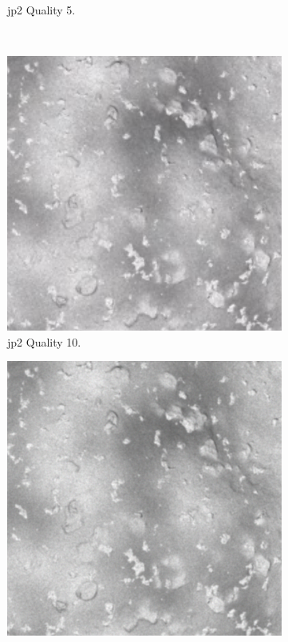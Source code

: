 \begin{figure}[htb]
\begin{subfigure}[b]{0.47\textwidth}
            \caption{\gls{jp2} Quality 5.}
            \label{fig:img_quality_5}
        \end{subfigure}
        \\
        \begin{subfigure}[b]{0.47\textwidth}
            \centering
            \includegraphics[width=\textwidth]{doc/thesis/0_figures/compare_quality/set1/center/jp2_10_center.png}
            \caption{\gls{jp2} Quality 10.}
            \label{fig:img_quality_10}
        \end{subfigure}
        \begin{subfigure}[b]{0.47\textwidth}
            \centering
            \includegraphics[width=\textwidth]{doc/thesis/0_figures/compare_quality/set1/center/jp2_100_center.png}

\end{subfigure}
\end{figure}
